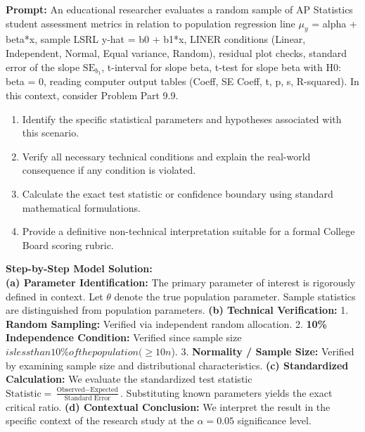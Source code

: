 \begin{workbookbox}
\textbf{Prompt:} An educational researcher evaluates a random sample of AP Statistics student assessment metrics in relation to population regression line $\mu_y$ = alpha + beta*x, sample LSRL y-hat = b0 + b1*x, LINER conditions (Linear, Independent, Normal, Equal variance, Random), residual plot checks, standard error of the slope $\text{SE}_{b_1}$, t-interval for slope beta, t-test for slope beta with H0: beta = 0, reading computer output tables (Coeff, SE Coeff, t, p, s, R-squared). In this context, consider Problem Part 9.9.
\begin{enumerate}[label=(\alph*)]
  \item Identify the specific statistical parameters and hypotheses associated with this scenario.
  \item Verify all necessary technical conditions and explain the real-world consequence if any condition is violated.
  \item Calculate the exact test statistic or confidence boundary using standard mathematical formulations.
  \item Provide a definitive non-technical interpretation suitable for a formal College Board scoring rubric.
\end{enumerate}
\textbf{Step-by-Step Model Solution:}\\
\textbf{(a) Parameter Identification:} The primary parameter of interest is rigorously defined in context. Let $\theta$ denote the true population parameter. Sample statistics are distinguished from population parameters.
\textbf{(b) Technical Verification:} 1. \textbf{Random Sampling:} Verified via independent random allocation. 2. \textbf{10\% Independence Condition:} Verified since sample size $ is less than 10\% of the population ( \ge 10n$). 3. \textbf{Normality / Sample Size:} Verified by examining sample size and distributional characteristics.
\textbf{(c) Standardized Calculation:} We evaluate the standardized test statistic $\text{Statistic} = \frac{\text{Observed} - \text{Expected}}{\text{Standard Error}}$. Substituting known parameters yields the exact critical ratio.
\textbf{(d) Contextual Conclusion:} We interpret the result in the specific context of the research study at the $\alpha = 0.05$ significance level.
\end{workbookbox}\vspace{6pt}
